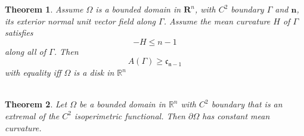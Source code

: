 \documentclass[oneside]{book}
\newtheorem{theorem}{Theorem}[section]
\begin{document}
\begin{theorem}
\label{t:5}
Assume $\Omega$ is a bounded domain in $\mathbf{R}^{n}$, with $C^{2}$ boundary $\Gamma$
and $\mathbf{n}$, its exterior normal unit vector field along $\Gamma$. Assume the mean curvature
$H$ of $\Gamma$ satisfies
$$
-H \leq n-1
$$
along all of $\Gamma$. Then
$$
A(\Gamma) \geq \mathfrak{c}_{\mathfrak{n}-1}
$$
with equality iff $\Omega$ is a disk in $\mathbb{R}^{n}$ \\\\
\end{theorem}





\begin{theorem}
\label{t:5.5}
 Let $\Omega$ be a bounded domain in $\mathbb{R}^{n}$ with $C^{2}$ boundary that is an extremal of the $C^{2}$ isoperimetric functional. Then  $\partial \Omega$ has constant mean curvature.
\end{theorem}
\end{document}
